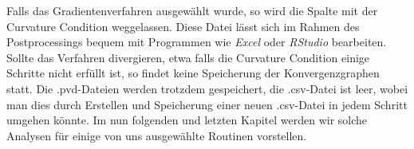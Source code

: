 Falls das Gradientenverfahren ausgewählt wurde, so wird die Spalte mit der Curvature Condition weggelassen. Diese Datei lässt sich im Rahmen des Postprocessings bequem mit Programmen wie \textit{Excel} oder \textit{RStudio} bearbeiten. Sollte das Verfahren divergieren, etwa falls die Curvature Condition einige Schritte nicht erfüllt ist, so findet keine Speicherung der Konvergenzgraphen statt. Die \textsf{.pvd}-Dateien werden trotzdem gespeichert, die \textsf{.csv}-Datei ist leer, wobei man dies durch Erstellen und Speicherung einer neuen \textsf{.csv}-Datei in jedem Schritt umgehen könnte. 
Im nun folgenden und letzten Kapitel werden wir solche Analysen für einige von uns ausgewählte Routinen vorstellen.

\newpage
